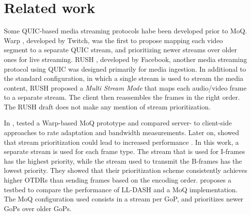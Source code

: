 
\chapter{Related work}\label{chapter:related_work}

Some QUIC-based media streaming protocols habe been developed prior to \ac{MoQ}. Warp \parencite{curleyWarpSegmentedLive2022}, developed by Twitch, was the first to propose mapping each video segment to a separate QUIC stream, and prioritizing newer streams over older ones for live streaming. RUSH \parencite{puginRUSHReliableUnreliable2021}, developed by Facebook, another media streaming protocol using QUIC was designed primarily for media ingestion. In additional to the standard configuration, in which a single stream is used to stream the media content, RUSH proposed a \textit{Multi Stream Mode} that maps each audio/video frame to a separate stream. The client then reassembles the frames in the right order. The RUSH draft does not make any mention of stream prioritization. %

In \parencite{gurelMediaQUICInitial2023}, \citeauthor{gurelMediaQUICInitial2023} tested a Warp-based MoQ prototype and compared server- to client-side approaches to rate adaptation and bandwidth measurements. Later on, \citeauthor{gurelThisWayPrioritization2024} showed that stream prioritization could lead to increased performance \parencite{gurelIBC2023TechPapers, gurelThisWayPrioritization2024}. In this work, a separate stream is used for each frame type. The stream that is used for I-frames has the highest priority, while the stream used to transmit the B-frames has the lowest priority. They showed that their prioritization scheme consistently achieves higher \ac{OTDR}s than sending frames based on the encoding order. \parencite{gurelMediaoverQUICTransportVs2024} proposes a testbed to compare the performance of LL-DASH and a MoQ implementation. The MoQ configuration used consists in a stream per GoP, and prioritizes newer GoPs over older GoPs.

